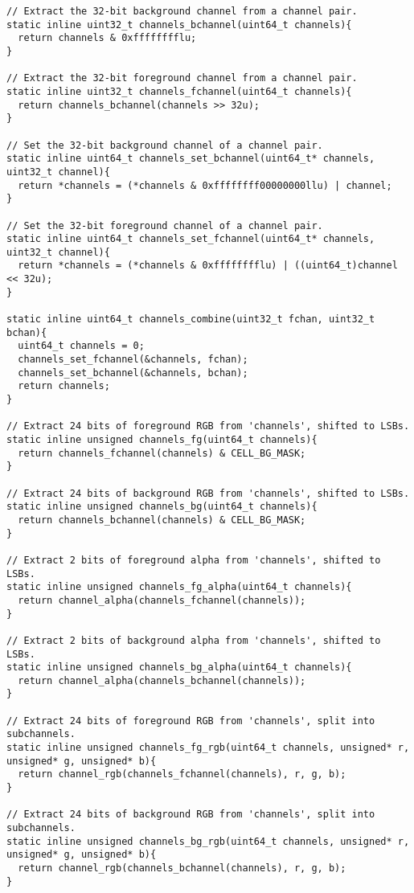 \bgroup
\begin{verbatim}
// Extract the 32-bit background channel from a channel pair.
static inline uint32_t channels_bchannel(uint64_t channels){
  return channels & 0xfffffffflu;
}

// Extract the 32-bit foreground channel from a channel pair.
static inline uint32_t channels_fchannel(uint64_t channels){
  return channels_bchannel(channels >> 32u);
}

// Set the 32-bit background channel of a channel pair.
static inline uint64_t channels_set_bchannel(uint64_t* channels, uint32_t channel){
  return *channels = (*channels & 0xffffffff00000000llu) | channel;
}

// Set the 32-bit foreground channel of a channel pair.
static inline uint64_t channels_set_fchannel(uint64_t* channels, uint32_t channel){
  return *channels = (*channels & 0xfffffffflu) | ((uint64_t)channel << 32u);
}

static inline uint64_t channels_combine(uint32_t fchan, uint32_t bchan){
  uint64_t channels = 0;
  channels_set_fchannel(&channels, fchan);
  channels_set_bchannel(&channels, bchan);
  return channels;
}

// Extract 24 bits of foreground RGB from 'channels', shifted to LSBs.
static inline unsigned channels_fg(uint64_t channels){
  return channels_fchannel(channels) & CELL_BG_MASK;
}

// Extract 24 bits of background RGB from 'channels', shifted to LSBs.
static inline unsigned channels_bg(uint64_t channels){
  return channels_bchannel(channels) & CELL_BG_MASK;
}

// Extract 2 bits of foreground alpha from 'channels', shifted to LSBs.
static inline unsigned channels_fg_alpha(uint64_t channels){
  return channel_alpha(channels_fchannel(channels));
}

// Extract 2 bits of background alpha from 'channels', shifted to LSBs.
static inline unsigned channels_bg_alpha(uint64_t channels){
  return channel_alpha(channels_bchannel(channels));
}

// Extract 24 bits of foreground RGB from 'channels', split into subchannels.
static inline unsigned channels_fg_rgb(uint64_t channels, unsigned* r, unsigned* g, unsigned* b){
  return channel_rgb(channels_fchannel(channels), r, g, b);
}

// Extract 24 bits of background RGB from 'channels', split into subchannels.
static inline unsigned channels_bg_rgb(uint64_t channels, unsigned* r, unsigned* g, unsigned* b){
  return channel_rgb(channels_bchannel(channels), r, g, b);
}


\end{verbatim}
